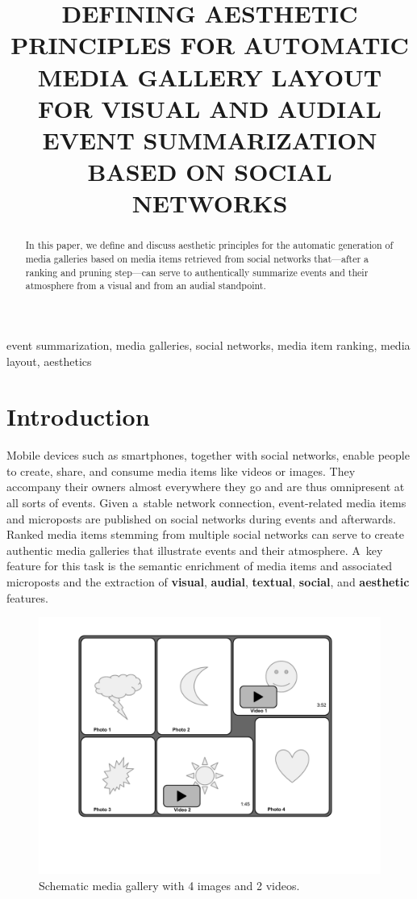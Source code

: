 \documentclass{article}
\title{DEFINING AESTHETIC PRINCIPLES FOR AUTOMATIC MEDIA GALLERY LAYOUT\\
FOR VISUAL AND AUDIAL EVENT SUMMARIZATION BASED ON SOCIAL NETWORKS}
\begin{document}
%
\maketitle
%
\begin{abstract}
In this paper, we define and discuss aesthetic principles
for the automatic generation of media galleries
based on media items retrieved from social networks
that---after a ranking and pruning step---can serve to authentically
summarize events and their atmosphere from a visual
and from an audial standpoint. 
\end{abstract}
%
\begin{keywords}
event summarization, media galleries, social networks,
media item ranking, media layout, aesthetics
\end{keywords}
%
\section{Introduction}
Mobile devices such as smartphones, together with social networks,
enable people to create, share, and consume media items
like videos or images.
They accompany their owners almost everywhere they go
and are thus omnipresent at all sorts of events.
Given a~stable network connection, event-related media items
and microposts are published on social networks
during events and afterwards.
Ranked media items stemming from multiple social networks
can serve to create authentic media galleries
that illustrate events and their atmosphere.
A~key feature for this task is the semantic enrichment
of media items and associated microposts
and the extraction of \textbf{visual}, \textbf{audial},
\textbf{textual}, \textbf{social}, and \textbf{aesthetic} features.

\begin{figure}[htb]
\centering
\includegraphics[trim=20mm 40mm 20mm 10mm, clip, width=0.75\columnwidth]{media-gallery.pdf}
\caption{Schematic media gallery with 4 images and 2 videos.}
\label{fig:media-gallery}
\end{figure}
\end{document}
